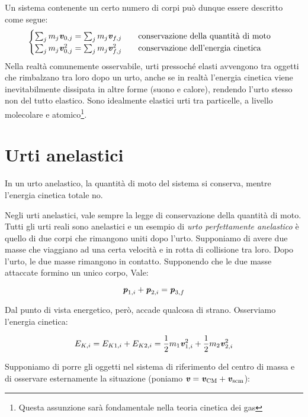 \noindent Un sistema contenente un certo numero di corpi può dunque essere descritto come segue:
\begin{align}
    \begin{cases}
        \sum_j m_j\textbf{\textit{v}}_{0,j} = \sum_j m_j\textbf{\textit{v}}_{f,j} \qquad \text{conservazione della quantità di moto}\\
        \sum_j m_j\textbf{\textit{v}}_{0,j}^2 = \sum_j m_j\textbf{\textit{v}}_{f,j}^2 \qquad \text{conservazione dell'energia cinetica}
    \end{cases}
\end{align}
Nella realtà comunemente osservabile, urti pressoché elasti avvengono tra
oggetti che rimbalzano tra loro dopo un urto, anche se in realtà l'energia
cinetica viene inevitabilmente dissipata in altre forme (suono e calore), rendendo
l'urto stesso non del tutto elastico. Sono idealmente elastici urti tra
particelle, a livello molecolare e atomico\footnote{Questa assunzione sarà fondamentale
nella teoria cinetica dei gas}.

\section{Urti anelastici}
\begin{tcolorbox}[colback = yellow!30, colframe = yellow!30!black, title = {Urto}]
    In un urto anelastico, la quantità di moto del sistema si conserva, mentre
    l'energia cinetica totale no.
\end{tcolorbox}
\vspace{5pt}

\noindent Negli urti anelastici, vale sempre la legge di conservazione della quantità
di moto. Tutti gli urti reali sono anelastici e un esempio di \textit{urto perfettamente
anelastico} è quello di due corpi che rimangono uniti dopo l'urto. Supponiamo di avere due masse che viaggiano ad una certa velocità
e in rotta di collisione tra loro. Dopo l'urto, le due masse rimangono
in contatto. Supponendo che le due masse attaccate formino un unico corpo, Vale:

\[ \textbf{\textit{p}}_{1,i} + \textbf{\textit{p}}_{2,i} = \textbf{\textit{p}}_{3,f} \]

\noindent Dal punto di vista energetico, però, accade qualcosa di strano. Osserviamo
l'energia cinetica:

\[ E_{K,i} = E_{K1, i} + E_{K2, i} = \frac12 m_1\textbf{\textit{v}}_{1,i}^2 + \frac12 m_2\textbf{\textit{v}}_{2,i}^2\]

\noindent Supponiamo di porre gli oggetti nel sistema di riferimento del centro di massa
e di osservare esternamente la situazione (poniamo $\textbf{\textit{v}} = \textbf{\textit{v}}_\text{CM} + \textbf{\textit{v}}_\text{scm}$):

